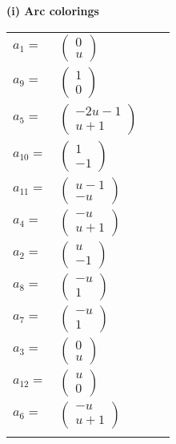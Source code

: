 \documentclass[1p]{elsarticle_modified}
\theoremstyle{definition}
\begin{document}
\flushleft \textbf{(i) Arc colorings}\\
\begin{tabular}{m{7pt} m{180pt} m{7pt} m{180pt} }
\flushright $a_{1}=$&$\begin{pmatrix}0\\u\end{pmatrix}$ \\
\flushright $a_{9}=$&$\begin{pmatrix}1\\0\end{pmatrix}$ \\
\flushright $a_{5}=$&$\begin{pmatrix}-2 u-1\\u+1\end{pmatrix}$ \\
\flushright $a_{10}=$&$\begin{pmatrix}1\\-1\end{pmatrix}$ \\
\flushright $a_{11}=$&$\begin{pmatrix}u-1\\- u\end{pmatrix}$ \\
\flushright $a_{4}=$&$\begin{pmatrix}- u\\u+1\end{pmatrix}$ \\
\flushright $a_{2}=$&$\begin{pmatrix}u\\-1\end{pmatrix}$ \\
\flushright $a_{8}=$&$\begin{pmatrix}- u\\1\end{pmatrix}$ \\
\flushright $a_{7}=$&$\begin{pmatrix}- u\\1\end{pmatrix}$ \\
\flushright $a_{3}=$&$\begin{pmatrix}0\\u\end{pmatrix}$ \\
\flushright $a_{12}=$&$\begin{pmatrix}u\\0\end{pmatrix}$ \\
\flushright $a_{6}=$&$\begin{pmatrix}- u\\u+1\end{pmatrix}$\\&\end{tabular}
\end{document}
